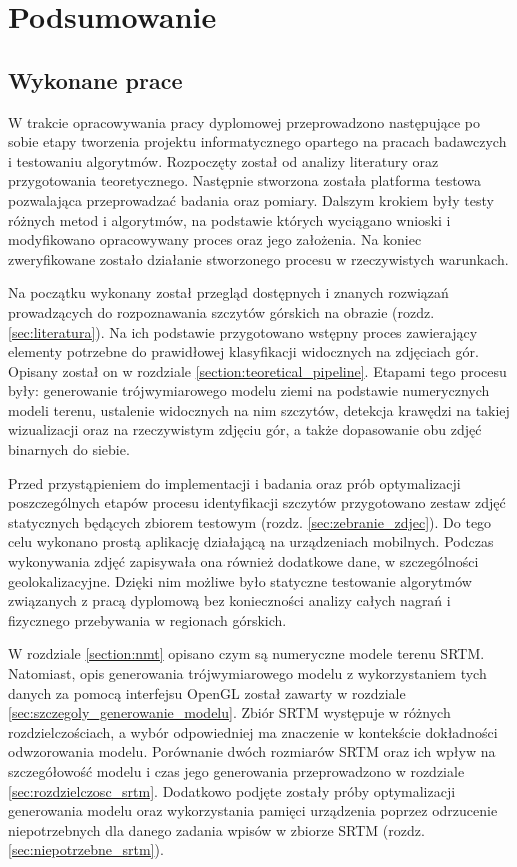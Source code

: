\newpage

\section{Podsumowanie}




\subsection{Wykonane prace}


W trakcie opracowywania pracy dyplomowej przeprowadzono następujące po sobie etapy tworzenia projektu informatycznego opartego na pracach badawczych i testowaniu algorytmów. Rozpoczęty został od analizy literatury oraz przygotowania teoretycznego. Następnie stworzona została platforma testowa pozwalająca przeprowadzać badania oraz pomiary. Dalszym krokiem były testy różnych metod i algorytmów, na podstawie których wyciągano wnioski i modyfikowano opracowywany proces oraz jego założenia. Na koniec zweryfikowane zostało działanie stworzonego procesu w rzeczywistych warunkach.

Na początku wykonany został przegląd dostępnych i znanych rozwiązań prowadzących do rozpoznawania szczytów górskich na obrazie (rozdz. \ref{sec:literatura}). Na ich podstawie przygotowano wstępny proces zawierający  elementy potrzebne do prawidłowej klasyfikacji widocznych na zdjęciach gór. Opisany został on w rozdziale \ref{section:teoretical_pipeline}. Etapami tego procesu były: generowanie trójwymiarowego modelu ziemi na podstawie numerycznych modeli terenu, ustalenie widocznych na nim szczytów, detekcja krawędzi na  takiej wizualizacji oraz na rzeczywistym zdjęciu gór, a także dopasowanie obu zdjęć binarnych do siebie.

Przed przystąpieniem do implementacji i badania oraz prób optymalizacji poszczególnych etapów procesu identyfikacji szczytów przygotowano zestaw zdjęć statycznych będących zbiorem testowym (rozdz. \ref{sec:zebranie_zdjec}). Do tego celu wykonano prostą aplikację działającą na urządzeniach mobilnych. Podczas wykonywania zdjęć zapisywała ona również dodatkowe dane, w szczególności geolokalizacyjne. Dzięki nim możliwe było statyczne testowanie algorytmów związanych z pracą dyplomową bez konieczności analizy całych nagrań i fizycznego przebywania w regionach górskich. 


W rozdziale \ref{section:nmt} opisano czym są numeryczne modele terenu SRTM. Natomiast, opis generowania trójwymiarowego modelu z wykorzystaniem tych danych za pomocą interfejsu OpenGL został zawarty w rozdziale \ref{sec:szczegoly_generowanie_modelu}. Zbiór SRTM występuje w różnych rozdzielczościach, a wybór odpowiedniej ma znaczenie w kontekście dokładności odwzorowania modelu. Porównanie dwóch rozmiarów SRTM oraz ich wpływ na szczegółowość modelu i czas jego generowania przeprowadzono w rozdziale \ref{sec:rozdzielczosc_srtm}. Dodatkowo podjęte zostały próby optymalizacji generowania modelu oraz wykorzystania pamięci urządzenia poprzez odrzucenie niepotrzebnych dla danego zadania wpisów w zbiorze SRTM (rozdz. \ref{sec:niepotrzebne_srtm}). 

